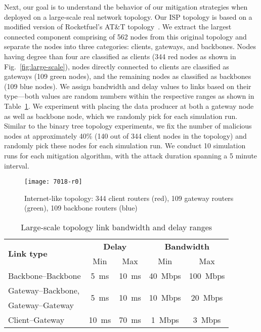 Next, our goal is to understand the behavior of our mitigation strategies when deployed on a large-scale real network topology. Our ISP topology is based on a modified version of Rocketfuel's AT\&T topology~\cite{rocketfuel}.
We extract the largest connected component comprising of 562 nodes from this original topology and separate the nodes into three categories: clients, gateways, and backbones. Nodes having degree than four are classified as clients (344 red nodes as shown in Fig.~\ref{fig:large-scale}), nodes directly connected to clients are classified as gateways (109 green nodes), and the remaining nodes as classified as backbones (109 blue nodes). 
We assign bandwidth and  delay values to links based on their type---both values are random numbers within the respective ranges as shown in Table~\ref{tab:large-scale}. We experiment with placing the data producer at both a gateway node as well as backbone node, which we randomly pick for each simulation run. Similar to the binary tree topology experiments, we fix the number of malicious nodes at approximately 40\% (140 out of 344 client nodes in the topology) and randomly pick these nodes for each simulation run. We conduct 10 simulation runs for each mitigation algorithm, with the attack duration spanning a 5 minute interval.

\begin{figure}[htbp]
  \centering
  \vspace{-.1cm}\texttt{[image: 7018-r0]}
  \caption{Internet-like topology: 344 client routers (red), 109 gateway routers (green), 109 backbone routers (blue)}\vspace{-.2cm}
  \label{fig:large-scale-topo}
\end{figure}

\begin{table}[htbp]
\centering
\caption{Large-scale topology link bandwidth and delay ranges}
\label{tab:large-scale}
\begin{tabular}{|l||c|c||c|c|}
  \hline
  \multirow{2}{*}{\bf Link type} &  \multicolumn{2}{|c||}{\bf Delay} &  \multicolumn{2}{|c|}{\bf Bandwidth} \tabularnewline
  \cline{2-5}
                        &  Min & Max                       &  Min & Max \tabularnewline
  \hline \hline
  Backbone--Backbone    & 5~ms & 10~ms   & 40~Mbps & 100~Mbps \tabularnewline
  \hline
  Gateway--Backbone,    & \multirow{2}{*}{5~ms} & \multirow{2}{*}{10~ms}   
                        & \multirow{2}{*}{10~Mbps} & \multirow{2}{*}{20~Mbps} \tabularnewline
  Gateway--Gateway      & & & & \\
  \hline
  Client--Gateway       & 10~ms & 70~ms   & 1~Mbps  & 3~Mbps \\
  \hline

\end{tabular}
\end{table}


